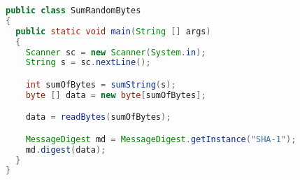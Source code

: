 \begin{figure}[t]
  \begin{center}
    \begin{lstlisting}[caption={Example of code with bytecode difference in library call},label={lst:ex},language=Java]
public class SumRandomBytes
{
  public static void main(String [] args)
  {
    Scanner sc = new Scanner(System.in);
    String s = sc.nextLine();

    int sumOfBytes = sumString(s);
    byte [] data = new byte[sumOfBytes];

    data = readBytes(sumOfBytes);

    MessageDigest md = MessageDigest.getInstance("SHA-1");
    md.digest(data);
  }
}
    \end{lstlisting}
  \end{center}
\end{figure}

